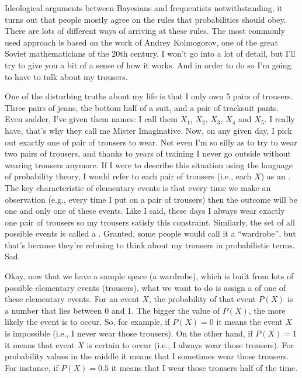 Ideological arguments between Bayesians and frequentists notwithstanding, it turns out that people mostly agree on the rules that probabilities should obey. There are lots of different ways of arriving at these rules. The most commonly used approach is based on the work of Andrey Kolmogorov, one of the great Soviet mathematicians of the 20th century. I won't go into a lot of detail, but I'll try to give you a bit of a sense of how it works. And in order to do so I'm going to have to talk about my trousers.


One of the disturbing truths about my life is that I only own 5 pairs of trousers. Three pairs of jeans, the bottom half of a suit, and a pair of tracksuit pants. Even sadder, I've given them names: I call them $X_1$, $X_2$, $X_3$, $X_4$ and $X_5$. I really have, that's why they call me Mister Imaginative. Now, on any given day, I pick out exactly one of pair of trousers to wear. Not even I'm so silly as to try to wear two pairs of trousers, and thanks to years of training I never go outside without wearing trousers anymore. If I were to describe this situation using the language of probability theory, I would refer to each pair of trousers (i.e., each $X$) as an . The key characteristic of elementary events is that every time we make an observation (e.g., every time I put on a pair of trousers) then the outcome will be one and only one of these events. Like I said, these days I always wear exactly one pair of trousers so my trousers satisfy this constraint. Similarly, the set of all possible events is called a . Granted, some people would call it a ``wardrobe'', but that's because they're refusing to think about my trousers in probabilistic terms. Sad.  

Okay, now that we have a sample space (a wardrobe), which is built from lots of possible elementary events (trousers), what we want to do is assign a  of one of these elementary events. For an event $X$, the probability of that event $P(X)$ is a number that lies between 0 and 1. The bigger the value of $P(X)$, the more likely the event is to occur. So, for example, if $P(X) = 0$ it means the event $X$ is impossible (i.e., I never wear those trousers). On the other hand, if $P(X) = 1$ it means that event $X$ is certain to occur (i.e., I always wear those trousers). For probability values in the middle it means that I sometimes wear those trousers. For instance, if $P(X) = 0.5$ it means that I wear those trousers half of the time. 

